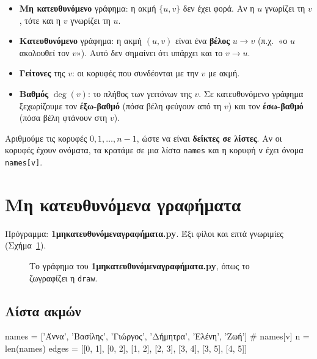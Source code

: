 \documentclass[11pt,a4paper]{article}
\newcommand{\code}[1]{\texttt{#1}}
\newcommand{\prog}[1]{\textsf{\bfseries #1}}
\renewcommand{\_}{\textunderscore\allowbreak}
\begin{document}
\begin{itemize}
  \item \textbf{Μη κατευθυνόμενο} γράφημα: η ακμή $\{u, v\}$ δεν έχει φορά. Αν η $u$ γνωρίζει τη $v$,
        τότε και η $v$ γνωρίζει τη $u$.
  \item \textbf{Κατευθυνόμενο} γράφημα: η ακμή $(u, v)$ είναι ένα \textbf{βέλος} $u \to v$
        (π.χ.\ «ο $u$ ακολουθεί τον $v$»). Αυτό δεν σημαίνει ότι υπάρχει και το $v \to u$.
  \item \textbf{Γείτονες} της $v$: οι κορυφές που συνδέονται με την $v$ με ακμή.
  \item \textbf{Βαθμός} $\deg(v)$: το πλήθος των γειτόνων της $v$. Σε κατευθυνόμενο γράφημα
        ξεχωρίζουμε τον \textbf{έξω-βαθμό} (πόσα βέλη φεύγουν από τη $v$) και τον \textbf{έσω-βαθμό}
        (πόσα βέλη φτάνουν στη $v$).
\end{itemize}

\begin{note}
Αριθμούμε τις κορυφές $0, 1, \dots, n-1$, ώστε να είναι \textbf{δείκτες σε λίστες}. Αν οι κορυφές
έχουν ονόματα, τα κρατάμε σε μια λίστα \code{names} και η κορυφή \code{v} έχει όνομα \code{names[v]}.
\end{note}

\section{Μη κατευθυνόμενα γραφήματα}
\noindent Πρόγραμμα: \prog{1\_μη\_κατευθυνόμενα\_γραφήματα.py}. Έξι φίλοι και επτά γνωριμίες
(Σχήμα~\ref{fig:undirected}).

\begin{figure}[h]
  \centering
  \caption{Το γράφημα του \prog{1\_μη\_κατευθυνόμενα\_γραφήματα.py}, όπως το ζωγραφίζει η
    \code{draw}.}
  \label{fig:undirected}
\end{figure}

\subsection{Λίστα ακμών}
\begin{Piton}
names = ['Άννα', 'Βασίλης', 'Γιώργος', 'Δήμητρα', 'Ελένη', 'Ζωή']   # names[v]
n = len(names)
edges = [[0, 1], [0, 2], [1, 2], [2, 3], [3, 4], [3, 5], [4, 5]]
\end{Piton}
\end{document}
